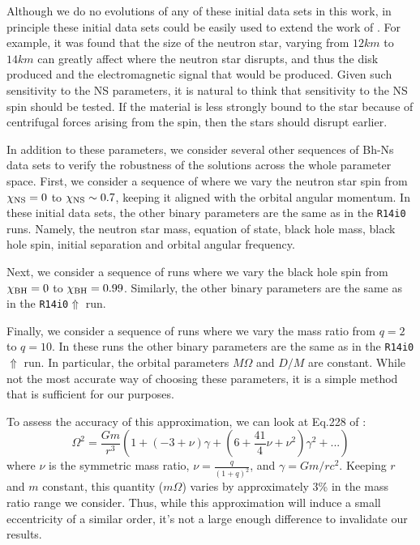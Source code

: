 Although we do no evolutions of any of these initial data sets in this
work, in principle these initial data sets could be easily used to
extend the work of \cite{Foucart:2013a}. For example, it was found
that the size of the neutron star, varying from $12km$ to $14km$ can
greatly affect where the neutron star disrupts, and thus the disk
produced and the electromagnetic signal that would be produced. Given
such sensitivity to the NS parameters, it is natural to think that
sensitivity to the NS spin should be tested. If the material is less
strongly bound to the star because of centrifugal forces arising from
the spin, then the stars should disrupt earlier.


In addition to these parameters, we consider several other sequences
of Bh-Ns data sets to verify the robustness of the solutions across
the whole parameter space. First, we consider a sequence of where we vary the neutron star spin from
$\chi_{\rm NS}=0$ to $\chi_{\rm NS}\sim0.7$, keeping it aligned with the orbital angular momentum. In these initial data sets, the other binary parameters are the same
as in the {\tt R14i0} runs. Namely, the neutron star mass, equation of state, black hole mass, black hole spin, initial separation and orbital angular frequency.

Next, we consider a sequence of runs where we vary the black hole spin from $\chi_{\rm BH}=0$ to $\chi_{\rm BH}=0.99$. Similarly, the other binary parameters are the same as in the {\tt R14i0$\Uparrow$} run.

Finally, we consider a sequence of runs where we vary the mass ratio from $q=2$ to $q=10$. In these runs the other binary parameters are the same as in the {\tt R14i0$\Uparrow$} run. In particular, the orbital parameters $M\Omega$ and $D/M$ are constant. While not the most accurate way of choosing these parameters, it is a simple method that is sufficient for our purposes.

To assess the accuracy of this approximation, we can look at Eq.228 of \cite{Blanchet2006}:
\begin{equation}
\Omega^2=\frac{Gm}{r^3}\left(1+(-3+\nu)\gamma+\left(6+\frac{41}{4}\nu+\nu^2\right)\gamma^2+...\right)
\end{equation}
where $\nu$ is the symmetric mass ratio, $\nu=\frac{q}{(1+q)^2}$, and $\gamma=Gm/rc^2$. Keeping $r$ and $m$ constant, this quantity ($m\Omega$) varies by approximately 3\% in the mass ratio range we consider.
Thus, while this approximation will induce a small eccentricity of a similar order, it's not a large enough difference to invalidate our results.


